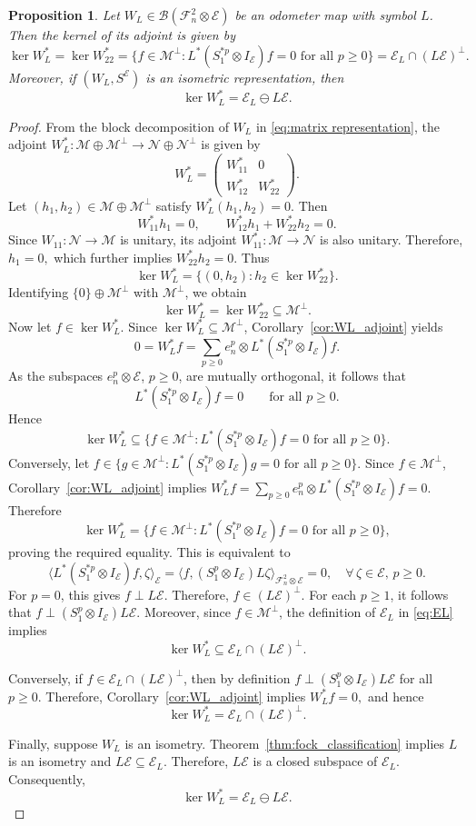 \documentclass[12pt]{amsart}
\newtheorem{proposition}[theorem]{Proposition}
\theoremstyle{definition}
\theoremstyle{remark}
\newcommand{\clb}{\mathcal{B}}
\newcommand{\cle}{\mathcal{E}}
\newcommand{\clm}{\mathcal{M}}
\newcommand{\cln}{\mathcal{N}}
\newcommand{\clf}{\mathcal{F}}
\numberwithin{equation}{section}
\begin{document}
\begin{proposition}\label{thm:kernel_adjoint}
Let $W_L \in \clb(\clf_n^2 \otimes \cle)$ be an odometer map with symbol $L$. Then the kernel of its adjoint is given by
\[
\ker W_L^* = \ker W_{22}^*=\{ f \in \clm^\perp : L^* (S_1^{*p} \otimes I_\cle) f = 0 \text{ for all } p \ge 0 \} 
= \cle_L \cap (L\cle)^\perp.
\]
Moreover, if $(W_L, S^\cle)$ is an isometric representation, then 
\[
\ker W_L^* = \cle_L \ominus L\cle.
\]
\end{proposition}
\begin{proof}
From the block decomposition of $W_L$ in \eqref{eq:matrix representation}, the adjoint $W_L^*:\clm\oplus \clm^\perp \to \cln\oplus \cln^\perp$
is given by
\[
W_L^*=
\begin{pmatrix}
W_{11}^* & 0\\
W_{12}^* & W_{22}^*
\end{pmatrix}.
\]
Let $(h_1,h_2)\in \clm\oplus \clm^\perp$ satisfy $W_L^*(h_1,h_2)=0.$
Then
\[
W_{11}^*h_1=0,\qquad
W_{12}^*h_1+W_{22}^*h_2=0.
\]
Since $W_{11}:\cln\to \clm$ is unitary, its adjoint $W_{11}^*:\clm\to \cln$
is also unitary. Therefore, $h_1=0,$
which further implies $W_{22}^*h_2=0.$
Thus
\[
\ker W_L^*=\{(0,h_2): h_2\in \ker W_{22}^*\}.
\]
Identifying $\{0\}\oplus \clm^\perp$ with $\clm^\perp$, we obtain
\[
\ker W_L^*=\ker W_{22}^*\subseteq \clm^\perp.
\]
Now let $f\in \ker W_L^*$. Since $\ker W_L^*\subseteq \clm^\perp$, Corollary~\ref{cor:WL_adjoint} yields
\[
0=W_L^*f=\sum_{p\ge 0} e_n^p\otimes L^*(S_1^{*p}\otimes I_\cle)f.
\]
As the subspaces $e_n^p\otimes \cle$, $p\ge 0$, are mutually orthogonal, it follows that
\[
L^*(S_1^{*p}\otimes I_\cle)f=0
\qquad \text{for all } p\ge 0.
\]
Hence
\[
\ker W_L^*
\subseteq
\{ f \in \clm^\perp : L^*(S_1^{*p}\otimes I_\cle)f=0
\text{ for all } p\ge 0\}.
\]
Conversely, let $f \in \{ g \in \clm^\perp : L^*(S_1^{*p}\otimes I_\cle)g=0
\text{ for all } p\ge 0\}.$
Since $f\in \clm^\perp$, Corollary~\ref{cor:WL_adjoint} implies $W_L^*f=
\sum_{p\ge 0} e_n^p\otimes L^*(S_1^{*p}\otimes I_\cle)f=0.$
Therefore
\[
\ker W_L^*
=
\{ f \in \clm^\perp : L^*(S_1^{*p}\otimes I_\cle)f=0
\text{ for all } p\ge 0\},
\]
proving the required equality. This is equivalent to 
\[
\langle L^*(S_1^{*p}\otimes I_\cle)f,\zeta\rangle_\cle=
\langle f,(S_1^p\otimes I_\cle)L\zeta\rangle_{\clf_n^2\otimes\cle}=0, \quad \forall\,\zeta \in \cle,\, p\ge0.
\]
For $p=0$, this gives $f\perp L\cle$. Therefore, $f \in (L\cle)^\perp.$
For each $p \ge 1$, it follows that $f \perp (S_1^{p}\otimes I_\cle)L\cle.$
Moreover, since $f \in \clm^\perp$, the definition of $\cle_L$ in \eqref{eq:EL} implies
\[
\ker W_L^* \subseteq \cle_L \cap (L\cle)^\perp.
\]

Conversely, if $f \in \cle_L \cap (L\cle)^\perp$, then by definition $f \perp (S_1^{p}\otimes I_\cle)L\cle$
for all $p \ge 0.$ Therefore, Corollary~\ref{cor:WL_adjoint} implies $ W_L^*f=0,$ and hence
\[
\ker W_L^* = \cle_L \cap (L\cle)^\perp.
\]

Finally, suppose $W_L$ is an isometry. Theorem~\ref{thm:fock_classification} implies $L$ is an isometry and $L\cle \subseteq \cle_L.$ Therefore, $L\cle$ is a closed subspace of $\cle_L$. Consequently, 
\[
\ker W_L^* =\cle_L \ominus L\cle.
\] 
\end{proof}
\end{document}
